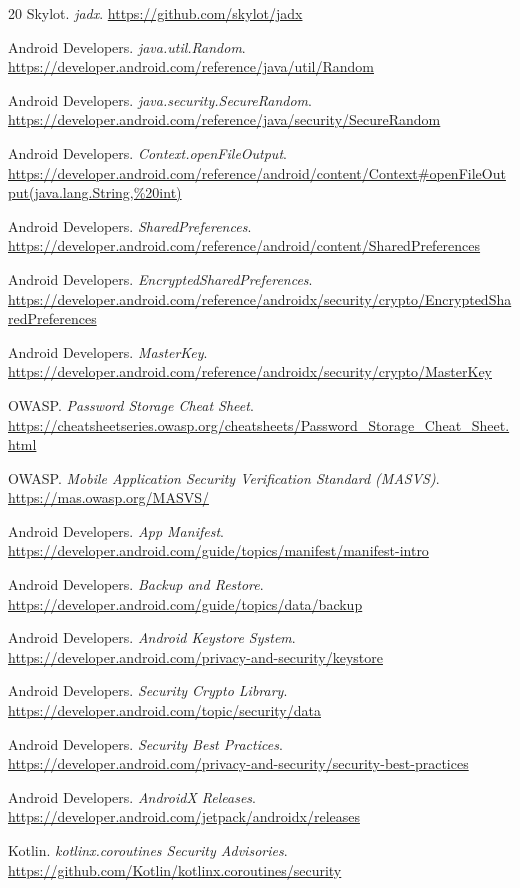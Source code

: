 \documentclass[letterpaper,twocolumn,10pt]{article}
\begin{document}
\begin{thebibliography}{20}
\small
{}
Skylot. \textit{jadx}. \url{https://github.com/skylot/jadx}

Android Developers. \textit{java.util.Random}. \url{https://developer.android.com/reference/java/util/Random}

Android Developers. \textit{java.security.SecureRandom}. \url{https://developer.android.com/reference/java/security/SecureRandom}

Android Developers. \textit{Context.openFileOutput}. \url{https://developer.android.com/reference/android/content/Context#openFileOutput(java.lang.String,%20int)}

Android Developers. \textit{SharedPreferences}. \url{https://developer.android.com/reference/android/content/SharedPreferences}

Android Developers. \textit{EncryptedSharedPreferences}. \url{https://developer.android.com/reference/androidx/security/crypto/EncryptedSharedPreferences}

Android Developers. \textit{MasterKey}. \url{https://developer.android.com/reference/androidx/security/crypto/MasterKey}

OWASP. \textit{Password Storage Cheat Sheet}. \url{https://cheatsheetseries.owasp.org/cheatsheets/Password_Storage_Cheat_Sheet.html}

OWASP. \textit{Mobile Application Security Verification Standard (MASVS)}. \url{https://mas.owasp.org/MASVS/}

Android Developers. \textit{App Manifest}. \url{https://developer.android.com/guide/topics/manifest/manifest-intro}

Android Developers. \textit{Backup and Restore}. \url{https://developer.android.com/guide/topics/data/backup}

Android Developers. \textit{Android Keystore System}. \url{https://developer.android.com/privacy-and-security/keystore}

Android Developers. \textit{Security Crypto Library}. \url{https://developer.android.com/topic/security/data}

Android Developers. \textit{Security Best Practices}. \url{https://developer.android.com/privacy-and-security/security-best-practices}

Android Developers. \textit{AndroidX Releases}. \url{https://developer.android.com/jetpack/androidx/releases}

Kotlin. \textit{kotlinx.coroutines Security Advisories}. \url{https://github.com/Kotlin/kotlinx.coroutines/security}
\end{thebibliography}
\end{document}
